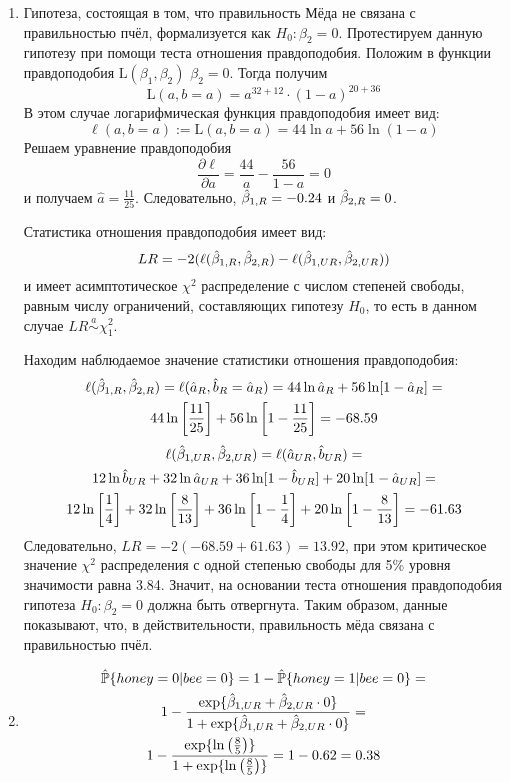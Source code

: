 \begin{problem}
\begin{sol}
\begin{enumerate}
\item Гипотеза, состоящая в том, что правильность Мёда не связана с правильностью
пчёл, формализуется как $H_0: \beta_2 = 0$. Протестируем данную гипотезу при помощи теста
отношения правдоподобия. Положим в функции правдоподобия $\text{L}(\beta_1, \beta_2)$ $\beta_2 = 0$. Тогда получим
\[
\text{L}(a, b=a) = a^{32+12} \cdot (1-a)^{20+36}
\]
В этом случае логарифмическая функция правдоподобия имеет вид:
\[
\ell(a, b=a) := \text{L}(a, b=a) = 44 \ln a + 56 \ln(1-a)
\]
Решаем уравнение правдоподобия
\[
\frac{\partial \ell}{\partial a} = \frac{44}{a} - \frac{56}{1 - a} = 0
\]
и получаем $\hat{a} = \frac{11}{25}$. Следовательно, $\hat{\beta}_{1, R} = -0.24$ и $\hat{\beta}_{2, R} = 0$.

Статистика отношения правдоподобия имеет вид:
\[
LR = -2(\ell(\hat{\beta}_{1, R}, \hat{\beta}_{2, R}) - \ell(\hat{\beta}_{1, UR}, \hat{\beta}_{2, UR}))
\]
и имеет асимптотическое $\chi^2$ распределение с числом степеней свободы, равным числу ограничений, составляющих гипотезу $H_0$, то есть в данном случае $LR \overset{a}{\sim} \chi^2_1$.

Находим наблюдаемое значение статистики отношения правдоподобия:
\begin{multline*}
\ell(\hat{\beta}_{1, R}, \hat{\beta}_{2, R}) = \ell(\hat{a}_R, \hat{b}_R = \hat{a}_R) = 44\ln\hat{a}_R + 56\ln[1-\hat{a}_R] =\\
 44\ln \left[ \frac{11}{25} \right] + 56\ln \left[ 1 - \frac{11}{25} \right] = -68.59
\end{multline*}
\begin{multline*}
\ell(\hat{\beta}_{1, UR}, \hat{\beta}_{2, UR}) = \ell(\hat{a}_{UR}, \hat{b}_{UR}) =\\
 12\ln \hat{b}_{UR} + 32 \ln \hat{a}_{UR} + 36\ln[1 - \hat{b}_{UR}] + 20\ln[1 - \hat{a}_{UR}] = \\
12\ln \left[ \frac{1}{4} \right] + 32\ln \left[ \frac{8}{13} \right] + 36\ln \left[ 1 - \frac{1}{4} \right] + 20\ln \left[1 - \frac{8}{13} \right] = -61.63
\end{multline*}
Следовательно, $LR = -2(-68.59 + 61.63) = 13.92$, при этом критическое значение $\chi^2$ распределения с одной степенью свободы для 5\% уровня значимости равна 3.84. Значит, на основании теста отношения правдоподобия гипотеза $H_0: \beta_2 = 0$ должна быть отвергнута. Таким образом, данные показывают, что, в действительности, правильность мёда связана с правильностью пчёл.

\item
\begin{multline*}
\hat{\mathbb{P}}\{honey = 0| bee = 0\} = 1 - \hat{\mathbb{P}}\{honey=1|bee=0\} = \\
1 - \frac{\exp\{\hat{\beta}_{1, UR} + \hat{\beta}_{2, UR} \cdot 0\}}{1 + \exp\{\hat{\beta}_{1, UR} + \hat{\beta}_{2, UR} \cdot 0\}} =\\
1 - \frac{\exp\{\ln\left( \frac{8}{5} \right)\}}{1 + \exp\{\ln\left( \frac{8}{5} \right)\}} = 1 - 0.62 = 0.38
\end{multline*}
\end{enumerate}
\end{sol}
\end{problem}



